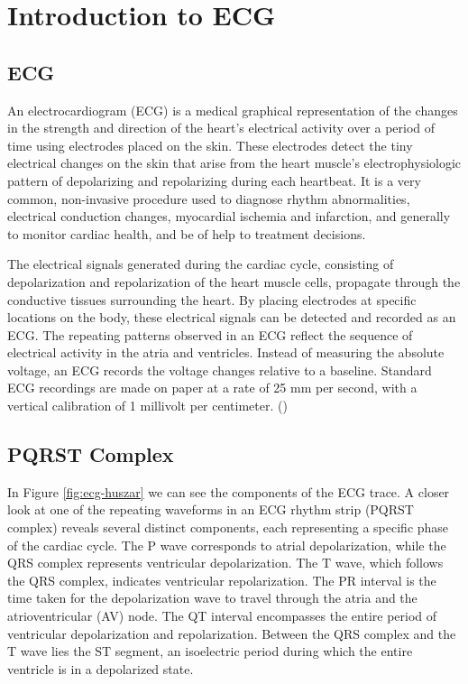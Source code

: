 \documentclass{mldsmsc}
\begin{document}
\clearpage

\section{Introduction to ECG}

\subsection{ECG}

An electrocardiogram (ECG) is a medical graphical representation of the changes in the strength and direction of the heart's electrical activity over a period of time using electrodes placed on the skin. These electrodes detect the tiny electrical changes on the skin that arise from the heart muscle's electrophysiologic pattern of depolarizing and repolarizing during each heartbeat. It is a very common, non-invasive procedure used to diagnose rhythm abnormalities, electrical conduction changes, myocardial ischemia and infarction, and generally to monitor cardiac health, and be of help to treatment decisions. \newline

\noindent The electrical signals generated during the cardiac cycle, consisting of depolarization and repolarization of the heart muscle cells, propagate through the conductive tissues surrounding the heart. By placing electrodes at specific locations on the body, these electrical signals can be detected and recorded as an ECG. The repeating patterns observed in an ECG reflect the sequence of electrical activity in the atria and ventricles. Instead of measuring the absolute voltage, an ECG records the voltage changes relative to a baseline. Standard ECG recordings are made on paper at a rate of 25 mm per second, with a vertical calibration of 1 millivolt per centimeter. (\cite{alma991000225790601591}) \newline

\subsection{PQRST Complex}

\noindent In Figure \ref{fig:ecg-huszar} we can see the components of the ECG trace. A closer look at one of the repeating waveforms in an ECG rhythm strip (PQRST complex) reveals several distinct components, each representing a specific phase of the cardiac cycle. The P wave corresponds to atrial depolarization, while the QRS complex represents ventricular depolarization. The T wave, which follows the QRS complex, indicates ventricular repolarization. The PR interval is the time taken for the depolarization wave to travel through the atria and the atrioventricular (AV) node. The QT interval encompasses the entire period of ventricular depolarization and repolarization. Between the QRS complex and the T wave lies the ST segment, an isoelectric period during which the entire ventricle is in a depolarized state.
\end{document}
